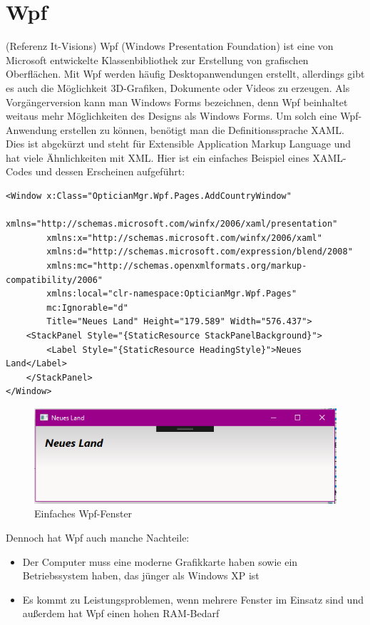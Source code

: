 \section{Wpf}
(Referenz It-Visions)
Wpf (Windows Presentation Foundation) ist eine von Microsoft entwickelte Klassenbibliothek zur Erstellung von grafischen Oberflächen. Mit Wpf werden häufig Desktopanwendungen erstellt, allerdings gibt es auch die Möglichkeit 3D-Grafiken, Dokumente oder Videos zu erzeugen. Als Vorgängerversion kann man Windows Forms bezeichnen, denn Wpf beinhaltet weitaus mehr Möglichkeiten des Designs als Windows Forms.
Um solch eine Wpf-Anwendung erstellen zu können, benötigt man die Definitionssprache XAML. Dies ist abgekürzt und steht für Extensible Application Markup Language und hat viele Ähnlichkeiten mit XML. Hier ist ein einfaches Beispiel eines XAML-Codes und dessen Erscheinen aufgeführt: 
\begin{lstlisting}
<Window x:Class="OpticianMgr.Wpf.Pages.AddCountryWindow"
        xmlns="http://schemas.microsoft.com/winfx/2006/xaml/presentation"
        xmlns:x="http://schemas.microsoft.com/winfx/2006/xaml"
        xmlns:d="http://schemas.microsoft.com/expression/blend/2008"
        xmlns:mc="http://schemas.openxmlformats.org/markup-compatibility/2006"
        xmlns:local="clr-namespace:OpticianMgr.Wpf.Pages"
        mc:Ignorable="d"
        Title="Neues Land" Height="179.589" Width="576.437">
    <StackPanel Style="{StaticResource StackPanelBackground}">
        <Label Style="{StaticResource HeadingStyle}">Neues Land</Label>
    </StackPanel>
</Window>
\end{lstlisting}
\begin{figure}[H]
\begin{center}
	\includegraphics[scale=.75]{images/Wpf.png}
\end{center}
	\caption{Einfaches Wpf-Fenster}
	\label{fig:sample}
\end{figure}
Dennoch hat Wpf auch manche Nachteile:
\begin{itemize}
\item Der Computer muss eine moderne Grafikkarte haben sowie ein Betriebssystem haben, das jünger als Windows XP ist
\item Es kommt zu Leistungsproblemen, wenn mehrere Fenster im Einsatz sind und außerdem hat Wpf einen hohen RAM-Bedarf
\end{itemize}
